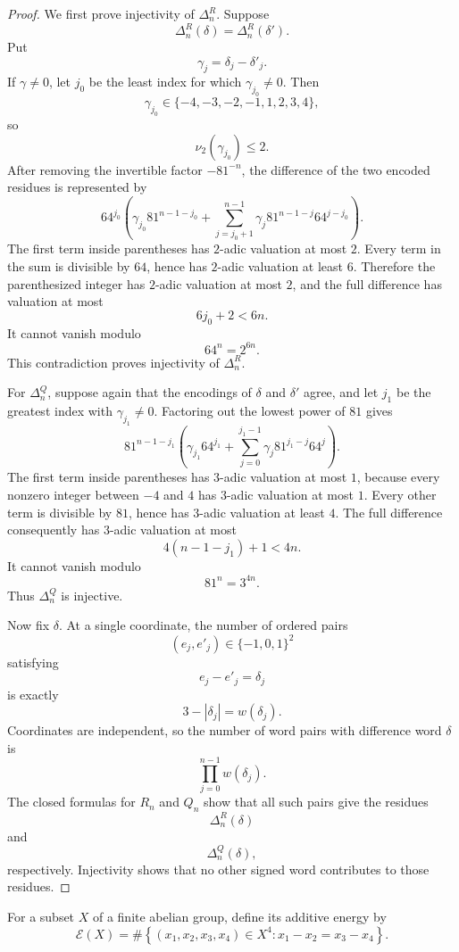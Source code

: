 \documentclass[11pt]{article}
\theoremstyle{remark}
\newcommand{\Ecal}{\mathcal{E}}
\begin{document}
\begin{proof}
We first prove injectivity of \(\Delta_n^R\).  Suppose
\[
\Delta_n^R(\delta)=\Delta_n^R(\delta').
\]
Put
\[
\gamma_j=\delta_j-\delta'_j.
\]
If \(\gamma\ne0\), let \(j_0\) be the least index for which \(\gamma_{j_0}\ne0\).  Then
\[
\gamma_{j_0}\in\{-4,-3,-2,-1,1,2,3,4\},
\]
so
\[
\nu_2(\gamma_{j_0})\le2.
\]
After removing the invertible factor \(-81^{-n}\), the difference of the two encoded residues is represented by
\[
64^{j_0}
\left(
\gamma_{j_0}81^{n-1-j_0}
+
\sum_{j=j_0+1}^{n-1}
\gamma_j81^{n-1-j}64^{j-j_0}
\right).
\]
The first term inside parentheses has \(2\)-adic valuation at most \(2\).  Every term in the sum is divisible by \(64\), hence has \(2\)-adic valuation at least \(6\).  Therefore the parenthesized integer has \(2\)-adic valuation at most \(2\), and the full difference has valuation at most
\[
6j_0+2<6n.
\]
It cannot vanish modulo
\[
64^n=2^{6n}.
\]
This contradiction proves injectivity of \(\Delta_n^R\).

For \(\Delta_n^Q\), suppose again that the encodings of \(\delta\) and \(\delta'\) agree, and let \(j_1\) be the greatest index with \(\gamma_{j_1}\ne0\).  Factoring out the lowest power of \(81\) gives
\[
81^{n-1-j_1}
\left(
\gamma_{j_1}64^{j_1}
+
\sum_{j=0}^{j_1-1}
\gamma_j81^{j_1-j}64^j
\right).
\]
The first term inside parentheses has \(3\)-adic valuation at most \(1\), because every nonzero integer between \(-4\) and \(4\) has \(3\)-adic valuation at most \(1\).  Every other term is divisible by \(81\), hence has \(3\)-adic valuation at least \(4\).  The full difference consequently has \(3\)-adic valuation at most
\[
4(n-1-j_1)+1<4n.
\]
It cannot vanish modulo
\[
81^n=3^{4n}.
\]
Thus \(\Delta_n^Q\) is injective.

Now fix \(\delta\).  At a single coordinate, the number of ordered pairs
\[
(e_j,e'_j)\in\{-1,0,1\}^2
\]
satisfying
\[
e_j-e'_j=\delta_j
\]
is exactly
\[
3-|\delta_j|=w(\delta_j).
\]
Coordinates are independent, so the number of word pairs with difference word \(\delta\) is
\[
\prod_{j=0}^{n-1}w(\delta_j).
\]
The closed formulas for \(R_n\) and \(Q_n\) show that all such pairs give the residues
\[
\Delta_n^R(\delta)
\]
and
\[
\Delta_n^Q(\delta),
\]
respectively.  Injectivity shows that no other signed word contributes to those residues.
\end{proof}

For a subset \(X\) of a finite abelian group, define its additive energy by
\[
\Ecal(X)
=
\#\left\{
(x_1,x_2,x_3,x_4)\in X^4:
x_1-x_2=x_3-x_4
\right\}.
\]
\end{document}
